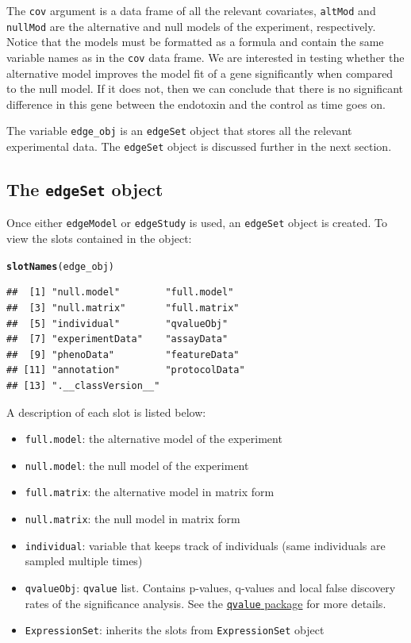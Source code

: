 \documentclass{article}\usepackage[]{graphicx}\usepackage[]{color}
\makeatletter
\newcommand{\hlstd}[1]{\textcolor[rgb]{0.345,0.345,0.345}{#1}}%
\newcommand{\hlkwd}[1]{\textcolor[rgb]{0.737,0.353,0.396}{\textbf{#1}}}%
\newenvironment{kframe}{%
 \def\at@end@of@kframe{}%
 \ifinner\ifhmode%
  \def\at@end@of@kframe{\end{minipage}}%
  \begin{minipage}{\columnwidth}%
 \fi\fi%
 \def\FrameCommand##1{\hskip\@totalleftmargin \hskip-\fboxsep
 \colorbox{shadecolor}{##1}\hskip-\fboxsep
     \hskip-\linewidth \hskip-\@totalleftmargin \hskip\columnwidth}%
 \MakeFramed {\advance\hsize-\width
   \@totalleftmargin\z@ \linewidth\hsize
   \@setminipage}}%
 {\par\unskip\endMakeFramed%
 \at@end@of@kframe}
\newenvironment{knitrout}{}{} %
\makeatother
\begin{document}
The {\tt cov} argument is a data frame of all the relevant covariates, {\tt altMod} and {\tt nullMod} are the alternative and null models of the experiment, respectively. Notice that the models must be formatted as a formula and contain the same variable names as in the {\tt cov} data frame. We are interested in testing whether the alternative model improves the model fit of a gene significantly when compared to the null model. If it does not, then we can conclude that there is no significant difference in this gene between the endotoxin and the control as time goes on. 

The variable {\tt edge\_obj} is an {\tt edgeSet} object that stores all the relevant experimental data. The {\tt edgeSet} object is discussed further in the next section. 

\subsection{The {\tt edgeSet} object}
Once either {\tt edgeModel} or {\tt edgeStudy} is used, an {\tt edgeSet} object is created. To view the slots contained in the object:
\begin{knitrout}
\color{fgcolor}\begin{kframe}
\begin{alltt}
\hlkwd{slotNames}\hlstd{(edge_obj)}
\end{alltt}
\begin{verbatim}
##  [1] "null.model"        "full.model"       
##  [3] "null.matrix"       "full.matrix"      
##  [5] "individual"        "qvalueObj"        
##  [7] "experimentData"    "assayData"        
##  [9] "phenoData"         "featureData"      
## [11] "annotation"        "protocolData"     
## [13] ".__classVersion__"
\end{verbatim}
\end{kframe}
\end{knitrout}
A description of each slot is listed below: 
\begin{itemize}
\item {\tt full.model}: the alternative model of the experiment
\item {\tt null.model}: the null model of the experiment
\item {\tt full.matrix}: the alternative model in matrix form
\item {\tt null.matrix}: the null model in matrix form
\item {\tt individual}: variable that keeps track of individuals (same individuals are sampled multiple times)
\item {\tt qvalueObj}: {\tt qvalue} list. Contains p-values, q-values and local false discovery rates of the significance analysis. See the \href{http://www.bioconductor.org/packages/release/bioc/html/qvalue.html}{{\tt qvalue} package} for more details.
\item {\tt ExpressionSet}: inherits the slots from {\tt ExpressionSet} object
\end{itemize}
\end{document}
